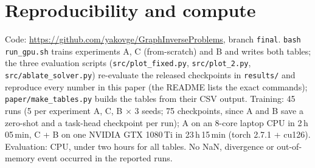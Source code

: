 \documentclass{article}
\begin{document}
\section{Reproducibility and compute}
\label{app:repro}
Code: \url{https://github.com/yakovge/GraphInverseProblems}, branch \texttt{final}. \texttt{bash run\_gpu.sh}
trains experiments A, C (from-scratch) and B and writes both tables; the three evaluation scripts
(\texttt{src/plot\_fixed.py}, \texttt{src/plot\_2.py}, \texttt{src/ablate\_solver.py}) re-evaluate the released
checkpoints in \texttt{results/} and reproduce every number in this paper (the README lists the exact
commands); \texttt{paper/make\_tables.py} builds the tables from their CSV output.
Training: 45 runs (5 per experiment A, C, B $\times$ 3 seeds; 75 checkpoints, since A and B save a zero-shot
and a task-head checkpoint per run); A on an 8-core laptop CPU in 2\,h\,05\,min, C + B on one NVIDIA
GTX 1080\,Ti in 23\,h\,15\,min (torch 2.7.1 + cu126). Evaluation: CPU, under two hours
for all tables. No NaN, divergence or out-of-memory event occurred in the reported runs.
\end{document}
